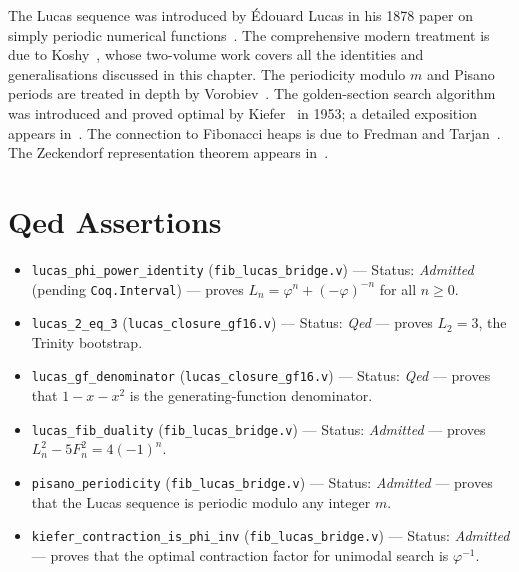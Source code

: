 The Lucas sequence was introduced by Édouard Lucas in his 1878 paper
on simply periodic numerical functions~\cite{lucas1878theorie}.
The comprehensive modern treatment is due to Koshy~\cite{koshy_fib_lucas},
whose two-volume work covers all the identities and generalisations
discussed in this chapter.
The periodicity modulo \(m\) and Pisano periods are treated in depth by
Vorobiev~\cite{vorobiev2003fibonacci}.
The golden-section search algorithm was introduced and proved optimal
by Kiefer~\cite{kiefer1953sequential} in 1953; a detailed exposition
appears in~\cite{wild1986optimization}.
The connection to Fibonacci heaps is due to Fredman and
Tarjan~\cite{fredman1987fibonacci}.
The Zeckendorf representation theorem appears
in~\cite{zeckendorf1972representation}.

\section{Qed Assertions}
\label{sec:gh-qed}

\begin{itemize}
  \item \texttt{lucas\_phi\_power\_identity}
        (\texttt{fib\_lucas\_bridge.v}) --- Status: \emph{Admitted}
        (pending \texttt{Coq.Interval}) ---
        proves \(L_n = \varphi^n + (-\varphi)^{-n}\) for all \(n \geq 0\).
  \item \texttt{lucas\_2\_eq\_3}
        (\texttt{lucas\_closure\_gf16.v}) --- Status: \emph{Qed} ---
        proves \(L_2 = 3\), the Trinity bootstrap.
  \item \texttt{lucas\_gf\_denominator}
        (\texttt{lucas\_closure\_gf16.v}) --- Status: \emph{Qed} ---
        proves that \(1-x-x^2\) is the generating-function denominator.
  \item \texttt{lucas\_fib\_duality}
        (\texttt{fib\_lucas\_bridge.v}) --- Status: \emph{Admitted} ---
        proves \(L_n^2 - 5F_n^2 = 4(-1)^n\).
  \item \texttt{pisano\_periodicity}
        (\texttt{fib\_lucas\_bridge.v}) --- Status: \emph{Admitted} ---
        proves that the Lucas sequence is periodic modulo any integer \(m\).
  \item \texttt{kiefer\_contraction\_is\_phi\_inv}
        (\texttt{fib\_lucas\_bridge.v}) --- Status: \emph{Admitted} ---
        proves that the optimal contraction factor for unimodal search
        is \(\varphi^{-1}\).
\end{itemize}

